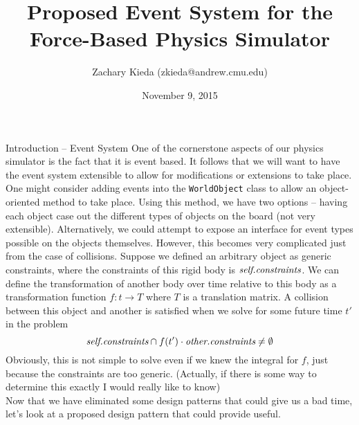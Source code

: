 \documentclass[11pt]{article}
\begin{document}
\title{Proposed Event System for the Force-Based Physics Simulator}
\author{Zachary Kieda (zkieda@andrew.cmu.edu)}
\date{November 9, 2015}
\maketitle

\begin{section}{Introduction -- Event System}
One of the cornerstone aspects of our physics simulator is the fact that it is event based. It follows that we will want to have the event system extensible to allow for modifications or extensions to take place.\\

One might consider adding events into the \verb|WorldObject| class to allow an object-oriented method to take place. Using this method, we have two options -- having each object case out the different types of objects on the board (not very extensible). Alternatively, we could attempt to expose an interface for event types possible on the objects themselves. However, this becomes very complicated just from the case of collisions. Suppose we defined an arbitrary object as generic constraints, where the constraints of this rigid body is $\emph{self.constraints}$. We can define the transformation of another body over time relative to this body as a transformation function $f : t \rightarrow T$ where $T$ is a translation matrix. A collision between this object and another is satisfied when we solve for some future time $t'$ in the problem 
\[\emph{self.constraints} \cap f(t') \cdot \emph{other.constraints} \neq \emptyset\]
Obviously, this is not simple to solve even if we knew the integral for $f$, just because the constraints are too generic. (Actually, if there is some way to determine this exactly I would really like to know)\\

Now that we have eliminated some design patterns that could give us a bad time, let's look at a proposed design pattern that could provide useful.
\end{section}
\end{document}
